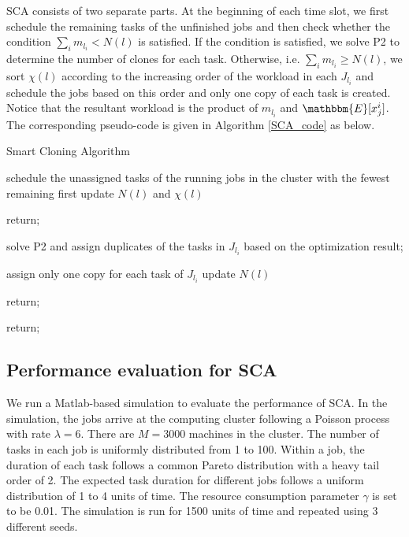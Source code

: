 \documentclass[10pt,conference]{IEEEtran}
\begin{document}
SCA consists of  two separate parts. At the beginning of each time slot, we first schedule the remaining tasks of the unfinished jobs and then check whether the condition $\sum_{i}m_{l_i} <  N(l)$ is satisfied. If the condition is satisfied, we solve  P2 to determine the number of clones for each task. Otherwise, i.e. $\sum_{i}m_{l_i} \geq  N(l)$,  we sort $\chi(l)$ according to the increasing order of the workload in each $J_{l_i}$ and schedule the jobs based on this order and only one copy of each task is created.
Notice that the resultant workload is the product of $m_{l_i}$ and $\mathbbm{E}[x^i_j]$. The corresponding pseudo-code is given in Algorithm \ref{SCA_code} as below.


\IncMargin{1em}
\begin{algorithm}
\label{SCA_code}
\caption{Smart Cloning Algorithm}
\Indm
{}
\Indp
schedule the unassigned tasks of the running jobs in the cluster with the fewest remaining first\;
update $N(l)$ and $\chi(l)$\;

{
return;
}

{
solve P2 and assign duplicates of the tasks in $J_{l_i}$ based on the optimization result;
}
{
{
assign only one copy for each task of $J_{l_i}$\;
update $N(l)$\;

{
return;
}
}
}

return;
\end{algorithm}
\DecMargin{1em}
\vspace{-0.3em}

\subsection{Performance evaluation for SCA}
We run a Matlab-based simulation to evaluate the performance of SCA. In the simulation, the jobs arrive at the computing cluster following a Poisson process with rate $\lambda = 6$. There are $M = 3000$ machines in the cluster. The number of tasks in each job is uniformly distributed from 1 to 100. Within a job, the duration of each task follows a common Pareto distribution with a heavy tail order of 2. The expected task duration for different jobs follows a uniform distribution of 1 to 4 units of time.
The resource consumption parameter $\gamma$ is set to be 0.01.
The simulation is run for 1500 units of time and repeated using 3 different seeds.
\end{document}
